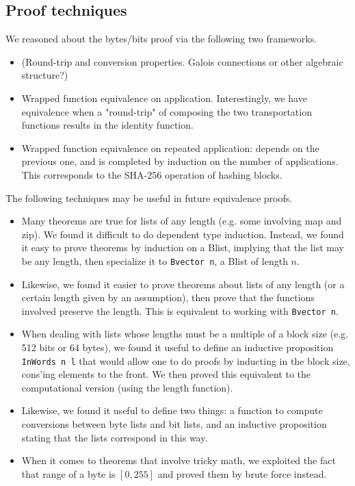 \documentclass[twocolumn,showpacs,%
  nofootinbib,aps,superscriptaddress,%
  eqsecnum,prd,notitlepage,showkeys,10pt]{revtex4-1}
\begin{document}
\subsection{Proof techniques}

We reasoned about the bytes/bits proof via the following two frameworks.

\begin{itemize}
\item (Round-trip and conversion properties. Galois connections or other algebraic structure?)
\item Wrapped function equivalence on application. Interestingly, we have equivalence when a "round-trip" of composing the two transportation functions results in the identity function.
\item Wrapped function equivalence on repeated application: depends on the previous one, and is completed by induction on the number of applications. This corresponds to the SHA-256 operation of hashing blocks.
\end{itemize}

The following techniques may be useful in future equivalence proofs.

\begin{itemize}
\item Many theorems are true for lists of any length (e.g. some involving map and zip). We found it difficult to do dependent type induction. Instead, we found it easy to prove theorems by induction on a Blist, implying that the list may be any length, then specialize it to \verb|Bvector n|, a Blist of length $n$. 
\item Likewise, we found it easier to prove theorems about lists of any length (or a certain length given by an assumption), then prove that the functions involved preserve the length. This is equivalent to working with \verb|Bvector n|.
\item When dealing with lists whose lengths must be a multiple of a block size (e.g. 512 bits or 64 bytes), we found it useful to define an inductive proposition \verb|InWords n l| that would allow one to do proofs by inducting in the block size, cons'ing elements to the front. We then proved this equivalent to the computational version (using the length function).
\item Likewise, we found it useful to define two things: a function to compute conversions between byte lists and bit lists, and an inductive proposition stating that the lists correspond in this way.
\item When it comes to theorems that involve tricky math, we exploited the fact that range of a byte is $[0, 255]$ and proved them by brute force instead.
\end{itemize}
\end{document}
